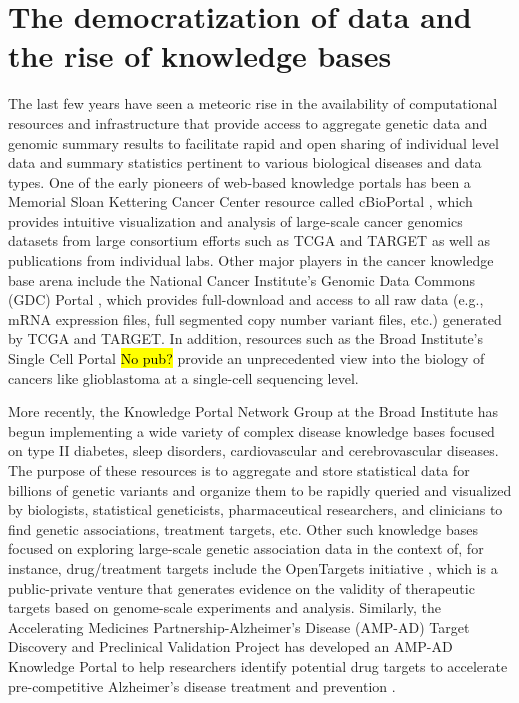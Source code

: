 \documentclass[letter]{bioinfo}
\begin{document}
\section*{The democratization of data and the rise of knowledge bases}

The last few years have seen a meteoric rise in the availability of computational resources and infrastructure that provide access to aggregate genetic data and genomic summary results to facilitate rapid and open sharing of individual level data and summary statistics pertinent to various biological diseases and data types.  One of the early pioneers of web-based knowledge portals has been a Memorial Sloan Kettering Cancer Center resource called cBioPortal \citep{Cerami:2012:cBio,Gao:2013:Integrative}, which provides intuitive visualization and analysis of large-scale cancer genomics datasets from large consortium efforts such as TCGA \citep{TheCancerGenomeAtlasResearchNetwork:2013:Cancer} and TARGET \citep{Koscielny:2017:Open} as well as publications from individual labs.  Other major players in the cancer knowledge base arena include the National Cancer Institute's Genomic Data Commons (GDC) Portal \citep{Grossman:2016:Shared,Jensen:2017:NCI}, which provides full-download and access to all raw data (e.g., mRNA expression files, full segmented copy number variant files, etc.) generated by TCGA and TARGET.  In addition, resources such as the Broad Institute's Single Cell Portal \hl{No pub?} provide an unprecedented view into the biology of cancers like glioblastoma at a single-cell sequencing level.    
	
More recently, the Knowledge Portal Network Group at the Broad Institute has begun implementing a wide variety of complex disease knowledge bases focused on type II diabetes, sleep disorders, cardiovascular and cerebrovascular diseases.  The purpose of these resources is to aggregate and store statistical data for billions of genetic variants and organize them to be rapidly queried and visualized by biologists, statistical geneticists, pharmaceutical researchers, and clinicians to find genetic associations, treatment targets, etc.  Other such knowledge bases focused on exploring large-scale genetic association data in the context of, for instance, drug/treatment targets include the OpenTargets initiative \citep{Koscielny:2017:Open}, which is a public-private venture that generates evidence on the validity of therapeutic targets based on genome-scale experiments and analysis.  Similarly, the Accelerating Medicines Partnership-Alzheimer's Disease (AMP-AD) Target Discovery and Preclinical Validation Project has developed an AMP-AD Knowledge Portal to help researchers identify potential drug targets to accelerate pre-competitive Alzheimer's disease treatment and prevention \citep{NIA:2015:AMP}.  
	
\end{document}
